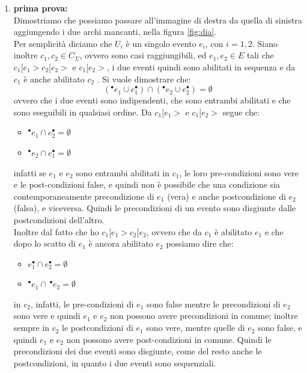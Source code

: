 \documentclass[a4paper,12pt, oneside]{book}
\begin{document}
\begin{enumerate}
  \item \textbf{prima prova:}\\
  Dimostriamo che possiamo passare all'immagine di destra da quella di sinistra
  aggiungendo i due archi mancanti, nella figura \ref{fig:dia}.\\
  Per semplicità diciamo che $U_i$ è un singolo evento $e_i$, con $i=1,2$. Siano
  inoltre $c_1,c_2\in C_\Sigma$, ovvero sono casi raggiungibili, ed $e_1,e_2\in
  E$ tali che $c_1 [e_1 > c_2 [e_2 > \mbox{ e } c_1 [e_2 >$, i due eventi quindi
  sono abilitati in sequenza e da $c_1$ è anche abilitato $c_2$ . Si vuole
  dimostrare che: 
  \[(^\bullet e_1\cup e_1^\bullet)\cap(^\bullet e_2\cup e_2^\bullet)=\emptyset\]
  ovvero che i due eventi sono indipendenti, che sono entrambi abilitati e che
  sono eseguibili in qualsiasi ordine.
  \newpage
  Da $c_1 [e_1 > \mbox{ e }c_1 [e_2 >$ segue che:
  \begin{itemize}
    \item $^\bullet e_1\cap e_2^\bullet=\emptyset$
    \item $^\bullet e_2\cap e_1^\bullet=\emptyset$
  \end{itemize}
  infatti se $e_1$ e $e_2$ sono entrambi abilitati in $c_1$, le loro
  pre-condizioni sono vere e le post-condizioni false, e quindi non è possibile
  che una condizione sia contemporaneamente precondizione di $e_1$ (vera) e
  anche postcondizione di $e_2$ (falsa), e viceversa. Quindi le precondizioni
  di un evento sono disgiunte dalle postcondizioni dell'altro.\\
  Inoltre dal fatto che ho $c_1 [e_1 > c_2 [e_2$, ovvero che da $c_1$ è
  abilitato $e_1$ e che dopo lo scatto di $e_1$ è ancora abilitato $e_2$
  possiamo dire che:
  \begin{itemize}
    \item $e_1^\bullet\cap e_2^\bullet=\emptyset$
    \item $^\bullet e_1\cap\, ^\bullet e_2=\emptyset$
  \end{itemize}
  in $c_2$, infatti, le pre-condizioni di $e_1$ sono false mentre le
  precondizioni di $e_2$ sono vere e quindi $e_1$ e $e_2$ non possono avere
  precondizioni in comune; inoltre sempre in $c_2$ le postcondizioni di $e_1$
  sono vere, mentre quelle di $e_2$ sono false, e quindi $e_1$ e $e_2$ non
  possono avere post-condizioni in comune. Quindi le precondizioni dei due
  eventi sono disgiunte, come del resto anche le postcondizioni, in quanto i due
  eventi sono sequenziali.\\

\end{enumerate}
\end{document}
